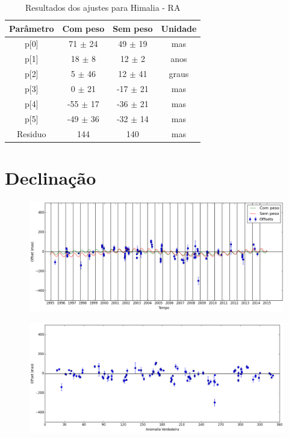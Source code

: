 \documentclass[11pt,a4paper]{report}
\begin{document}
\begin{table}[h!]
\caption{\label{Tab: Himalia-RA} Resultados dos ajustes para Himalia - RA}
\begin{centering}
\begin{tabular}{cccc}
\hline
\hline
Parâmetro & Com peso & Sem peso & Unidade\tabularnewline
\hline
p[0] & 71 $\pm$ 24 & 49 $\pm$ 19 & mas\\
p[1] & 18 $\pm$ 8 & 12 $\pm$ 2 & anos\\
p[2] & 5 $\pm$ 46 & 12 $\pm$ 41 & graus\\
p[3] & 0 $\pm$ 21 & -17 $\pm$ 21 & mas\\
p[4] & -55 $\pm$ 17 & -36 $\pm$ 21 & mas\\
p[5] & -49 $\pm$ 36 & -32 $\pm$ 14 & mas\\
Residuo & 144 & 140 & mas\\
\hline 
\end{tabular} 
\par\end{centering}
\end{table}

\section*{Declinação}

\begin{figure}[h]
\includegraphics[scale=0.45]{Himalia/DEC.png} 
\end{figure}

\begin{figure}[h]
\includegraphics[scale=0.45]{Himalia/DEC_anom.png}  
\end{figure}
\end{document}
